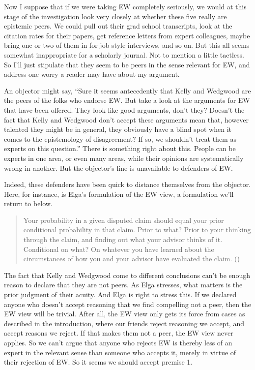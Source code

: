 \documentclass[
  11pt,
  letterpaper,
  DIV=11,
  numbers=noendperiod,
  oneside]{scrartcl}
\begin{document}
Now I suppose that if we were taking EW completely seriously, we would
at this stage of the investigation look very closely at whether these
five really are epistemic peers. We could pull out their grad school
transcripts, look at the citation rates for their papers, get reference
letters from expert colleagues, maybe bring one or two of them in for
job-style interviews, and so on. But this all seems somewhat
inappropriate for a scholarly journal. Not to mention a little
tactless. So I'll just stipulate
that they seem to be peers in the sense relevant for EW, and address one
worry a reader may have about my argument.

An objector might say, ``Sure it seems antecedently that Kelly and
Wedgwood are the peers of the folks who endorse EW. But take a look at
the arguments for EW that have been offered. They look like good
arguments, don't they? Doesn't the fact that Kelly and Wedgwood don't
accept these arguments mean that, however talented they might be in
general, they obviously have a blind spot when it comes to the
epistemology of disagreement? If so, we shouldn't treat them as experts
on this question.'' There is something right about this. People can be
experts in one area, or even many areas, while their opinions are
systematically wrong in another. But the objector's line is unavailable
to defenders of EW.

Indeed, these defenders have been quick to distance themselves from the
objector. Here, for instance, is Elga's formulation of the EW view, a
formulation we'll return to below.

\begin{quote}
Your probability in a given disputed claim should equal your prior
conditional probability in that claim. Prior to what? Prior to your
thinking through the claim, and finding out what your advisor thinks of
it. Conditional on what? On whatever you have learned about the
circumstances of how you and your advisor have evaluated the claim.
()
\end{quote}

The fact that Kelly and Wedgwood come to different conclusions can't be
enough reason to declare that they are not peers. As Elga stresses, what
matters is the prior judgment of their acuity. And Elga is right to
stress this. If we declared anyone who doesn't accept reasoning that we
find compelling not a peer, then the EW view will be trivial. After all,
the EW view only gets its force from cases as described in the
introduction, where our friends reject reasoning we accept, and accept
reasons we reject. If that makes them not a peer, the EW view never
applies. So we can't argue that anyone who rejects EW is thereby less of
an expert in the relevant sense than someone who accepts it, merely in
virtue of their rejection of EW. So it seems we should accept premise 1.
\end{document}
